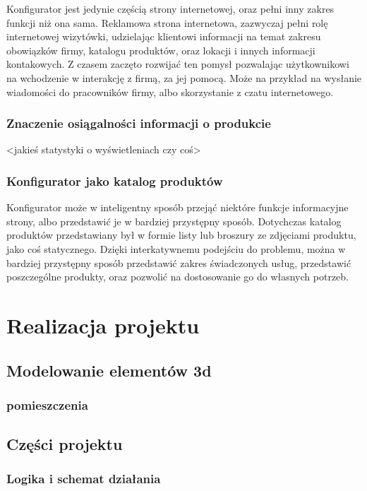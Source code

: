 \documentclass{article} %
\begin{document}
        Konfigurator jest jedynie częścią strony internetowej, oraz pełni inny zakres funkcji niż ona sama. Reklamowa strona internetowa, zazwyczaj pełni rolę internetowej wizytówki, udzielając klientowi informacji na temat zakresu obowiązków firmy, katalogu produktów, oraz lokacji i innych informacji kontakowych. Z czasem zaczęto rozwijać ten pomysł pozwalając użytkownikowi na wchodzenie w interakcję z firmą, za jej pomocą. Może na przykład na wysłanie wiadomości do pracowników firmy, albo skorzystanie z czatu internetowego.
        \\
        
        \subsubsection{Znaczenie osiągalności informacji o produkcie}
            <jakieś statystyki o wyświetleniach czy coś>
        \\
        
        \subsubsection{Konfigurator jako katalog produktów}
        Konfigurator może w inteligentny sposób przejąć niektóre funkcje informacyjne strony, albo przedstawić je w bardziej przystępny sposób. Dotychczas katalog produktów przedstawiany był w formie listy lub broszury ze zdjęciami produktu, jako coś statycznego. Dzięki interkatywnemu podejściu do problemu, można w bardziej przystępny sposób przedstawić zakres świadczonych usług, przedstawić poszczególne produkty, oraz pozwolić na dostosowanie go do własnych potrzeb.
        \\
        
\section{Realizacja projektu}
    \subsection{Modelowanie elementów 3d}
        \subsubsection{pomieszczenia}
    \subsection{Części projektu}
        \subsubsection{Logika i schemat działania}
\end{document}
